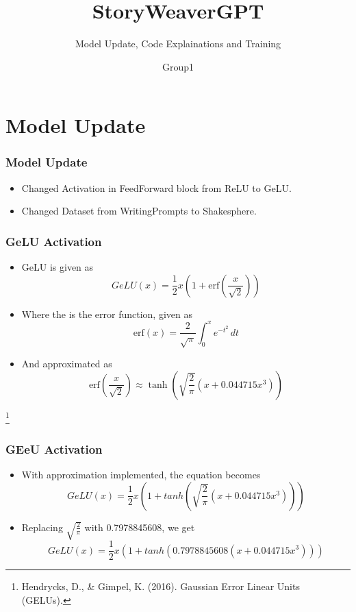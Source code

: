 \documentclass[
    10pt %
    16:9, %
]{beamer}
\title{StoryWeaverGPT}
\subtitle{Model Update, Code Explainations and Training}
\author{Group1}
\begin{document}
\frame{\titlepage}
\section[Outline]{}
\frame{\tableofcontents}

\section{Model Update}
 
\frame
{
  \frametitle{Model Update}
 
  \begin{itemize}
    \item Changed Activation in FeedForward block from ReLU to GeLU.
    \item Changed Dataset from WritingPrompts to Shakesphere.
  \end{itemize}
  
\vfill   
}

\frame
{
  \frametitle{GeLU Activation}
  \begin{itemize}
    \item GeLU is given as \[
    GeLU(x) = \frac{1}{2}x(1 + \text{erf}\left(\frac{x}{\sqrt{2}}\right))
    \]
    \item Where the  is the error function, given as \[
    \text{erf}(x) = \frac{2}{\sqrt{\pi}} \int_{0}^{x} e^{-t^2} \, dt
    \]
    \item And approximated as \[
    \text{erf}\left(\frac{x}{\sqrt{2}}\right) \approx \tanh\left(\sqrt{\frac{2}{\pi}}\left(x + 0.044715x^3\right)\right)
    \]
  \end{itemize}

  \vfill

  \footnote{Hendrycks, D., \& Gimpel, K. (2016). Gaussian Error Linear Units (GELUs).}
}

\frame
{
  \frametitle{GEeU Activation}
  \begin{itemize}
    \item With approximation implemented, the equation becomes \[
    GeLU(x) = \frac{1}{2}x(1 + tanh(\sqrt{\frac{2}{\pi}}(x + 0.044715x^3)))
    \]
    \item Replacing $\sqrt{\frac{2}{\pi}}$ with 0.7978845608, we get \[
    GeLU(x) = \frac{1}{2}x(1 + tanh(0.7978845608(x + 0.044715x^3)))
    \]
  \end{itemize}

\vfill
}
\end{document}
